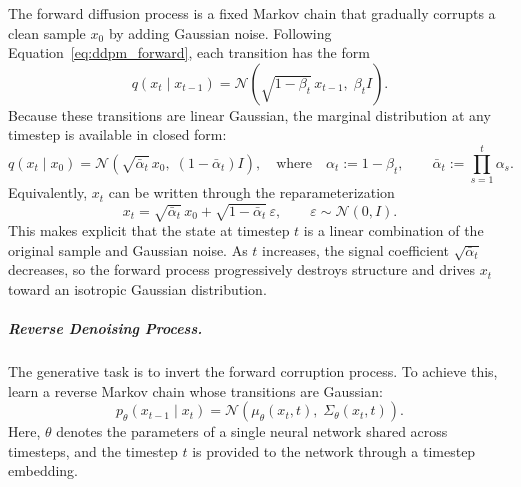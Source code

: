 The forward diffusion process is a fixed Markov chain that gradually corrupts a clean sample \(x_0\) by adding Gaussian noise. Following Equation~\ref{eq:ddpm_forward}, each transition has the form
\begin{equation}
    q(x_t\mid x_{t-1})
    =
    \mathcal{N}\!\left(
        \sqrt{1-\beta_t}\,x_{t-1},\;
        \beta_t I
    \right).
    \label{eq:ddpm_forward_transition}
\end{equation}
Because these transitions are linear Gaussian, the marginal distribution at any timestep is available in closed form:
\begin{equation}
    q(x_t\mid x_0)
    =
    \mathcal{N}\!\left(
        \sqrt{\bar\alpha_t}\,x_0,\;
        (1-\bar\alpha_t)I
    \right),
    \quad
    \text{where} \quad
    \alpha_t := 1-\beta_t,
    \qquad
    \bar\alpha_t := \prod_{s=1}^{t}\alpha_s.
    \label{eq:ddpm_forward_marginal}
\end{equation}
Equivalently, \(x_t\) can be written through the reparameterization
\begin{equation}
    x_t
    =
    \sqrt{\bar\alpha_t}\,x_0
    +
    \sqrt{1-\bar\alpha_t}\,\varepsilon,
    \qquad
    \varepsilon \sim \mathcal{N}(0, I).
    \label{eq:ddpm_forward_reparam}
\end{equation}
This makes explicit that the state at timestep \(t\) is a linear combination of the original sample and Gaussian noise. As \(t\) increases, the signal coefficient \(\sqrt{\bar\alpha_t}\) decreases, so the forward process progressively destroys structure and drives \(x_t\) toward an isotropic Gaussian distribution.

\subparagraph{Reverse Denoising Process.}

The generative task is to invert the forward corruption process. To achieve this, \citet{NEURIPS2020_4c5bcfec} learn a reverse Markov chain whose transitions are Gaussian:
\begin{equation}
    p_\theta(x_{t-1}\mid x_t)
    =
    \mathcal{N}\!\left(
        \mu_\theta(x_t,t),\;
        \Sigma_\theta(x_t,t)
    \right).
    \label{eq:ddpm_reverse}
\end{equation}
Here, \(\theta\) denotes the parameters of a single neural network shared across timesteps, and the timestep \(t\) is provided to the network through a timestep embedding.

